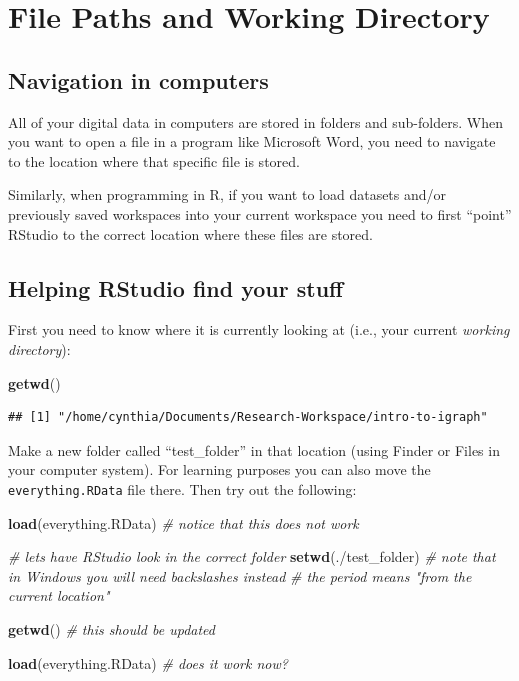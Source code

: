 \documentclass[
]{book}
\newenvironment{Shaded}{\begin{snugshade}}{\end{snugshade}}
\newcommand{\CommentTok}[1]{\textcolor[rgb]{0.56,0.35,0.01}{\textit{#1}}}
\newcommand{\FunctionTok}[1]{\textcolor[rgb]{0.13,0.29,0.53}{\textbf{#1}}}
\newcommand{\NormalTok}[1]{#1}
\newcommand{\StringTok}[1]{\textcolor[rgb]{0.31,0.60,0.02}{#1}}
\begin{document}
\section{File Paths and Working Directory}\label{file-paths-and-working-directory}

\subsection{Navigation in computers}\label{navigation-in-computers}

All of your digital data in computers are stored in folders and sub-folders. When you want to open a file in a program like Microsoft Word, you need to navigate to the location where that specific file is stored.

Similarly, when programming in R, if you want to load datasets and/or previously saved workspaces into your current workspace you need to first ``point'' RStudio to the correct location where these files are stored.

\subsection{Helping RStudio find your stuff}\label{helping-rstudio-find-your-stuff}

First you need to know where it is currently looking at (i.e., your current \emph{working directory}):

\begin{Shaded}
\begin{Highlighting}[]
\FunctionTok{getwd}\NormalTok{()}
\end{Highlighting}
\end{Shaded}

\begin{verbatim}
## [1] "/home/cynthia/Documents/Research-Workspace/intro-to-igraph"
\end{verbatim}

Make a new folder called ``test\_folder'' in that location (using Finder or Files in your computer system). For learning purposes you can also move the \texttt{everything.RData} file there. Then try out the following:

\begin{Shaded}
\begin{Highlighting}[]
\FunctionTok{load}\NormalTok{(}\StringTok{\textquotesingle{}everything.RData\textquotesingle{}}\NormalTok{) }\CommentTok{\# notice that this does not work }

\CommentTok{\# let\textquotesingle{}s have RStudio look in the correct folder }
\FunctionTok{setwd}\NormalTok{(}\StringTok{\textquotesingle{}./test\_folder\textquotesingle{}}\NormalTok{) }\CommentTok{\# note that in Windows you will need backslashes instead}
\CommentTok{\# the period means "from the current location"}

\FunctionTok{getwd}\NormalTok{() }\CommentTok{\# this should be updated }

\FunctionTok{load}\NormalTok{(}\StringTok{\textquotesingle{}everything.RData\textquotesingle{}}\NormalTok{) }\CommentTok{\# does it work now? }
\end{Highlighting}
\end{Shaded}
\end{document}
